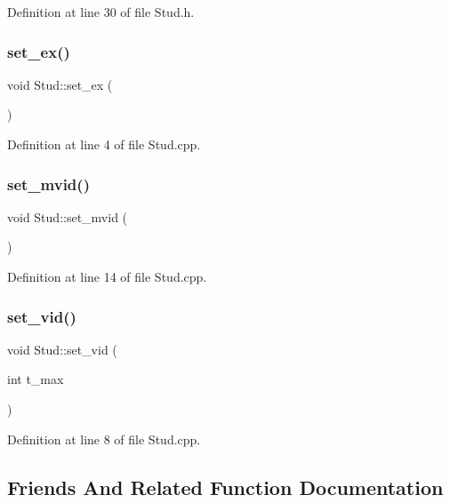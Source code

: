 Definition at line 30 of file Stud.\+h.

\mbox{\label{class_stud_a39a9a5b2fcf459c3e56396a418694e5c}} 
\subsubsection{\texorpdfstring{set\_ex()}{set\_ex()}\hspace{0.1cm}{\footnotesize\ttfamily [2/2]}}
{\footnotesize\ttfamily void Stud\+::set\+\_\+ex (\begin{DoxyParamCaption}{ }\end{DoxyParamCaption})}



Definition at line 4 of file Stud.\+cpp.

\mbox{\label{class_stud_a7ed1b42af6ad111a12c7aa21f922a01b}} 
\subsubsection{\texorpdfstring{set\_mvid()}{set\_mvid()}}
{\footnotesize\ttfamily void Stud\+::set\+\_\+mvid (\begin{DoxyParamCaption}{ }\end{DoxyParamCaption})}



Definition at line 14 of file Stud.\+cpp.

\mbox{\label{class_stud_a05d3a2f528ab191cb5d029c361fac3b7}} 
\subsubsection{\texorpdfstring{set\_vid()}{set\_vid()}}
{\footnotesize\ttfamily void Stud\+::set\+\_\+vid (\begin{DoxyParamCaption}\item[{int}]{t\+\_\+max }\end{DoxyParamCaption})}



Definition at line 8 of file Stud.\+cpp.



\subsection{Friends And Related Function Documentation}
\mbox{\label{class_stud_ac58e1fdedfbed178b8d5c57069020996}} 
